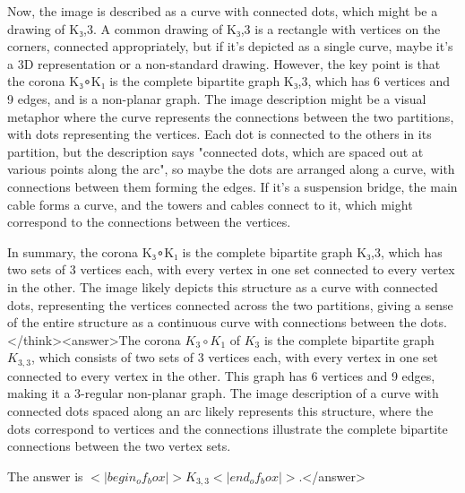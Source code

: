 Now, the image is described as a curve with connected dots, which might be a drawing of K₃,3. A common drawing of K₃,3 is a rectangle with vertices on the corners, connected appropriately, but if it's depicted as a single curve, maybe it's a 3D representation or a non-standard drawing. However, the key point is that the corona K₃∘K₁ is the complete bipartite graph K₃,3, which has 6 vertices and 9 edges, and is a non-planar graph. The image description might be a visual metaphor where the curve represents the connections between the two partitions, with dots representing the vertices. Each dot is connected to the others in its partition, but the description says "connected dots, which are spaced out at various points along the arc", so maybe the dots are arranged along a curve, with connections between them forming the edges. If it's a suspension bridge, the main cable forms a curve, and the towers and cables connect to it, which might correspond to the connections between the vertices. 

In summary, the corona K₃∘K₁ is the complete bipartite graph K₃,3, which has two sets of 3 vertices each, with every vertex in one set connected to every vertex in the other. The image likely depicts this structure as a curve with connected dots, representing the vertices connected across the two partitions, giving a sense of the entire structure as a continuous curve with connections between the dots.</think><answer>The corona \( K_3 \circ K_1 \) of \( K_3 \) is the complete bipartite graph \( K_{3,3} \), which consists of two sets of 3 vertices each, with every vertex in one set connected to every vertex in the other. This graph has 6 vertices and 9 edges, making it a 3-regular non-planar graph. The image description of a curve with connected dots spaced along an arc likely represents this structure, where the dots correspond to vertices and the connections illustrate the complete bipartite connections between the two vertex sets.  

The answer is \(<|begin_of_box|>K_{3,3}<|end_of_box|>\).</answer>